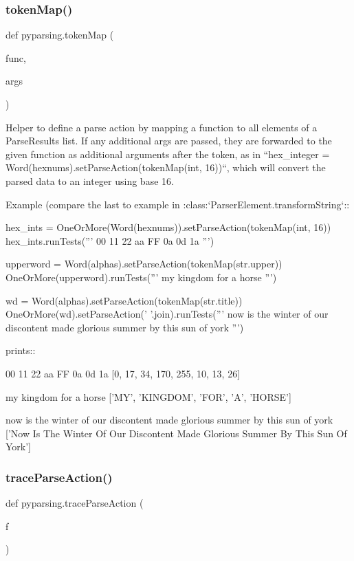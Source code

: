 \subsubsection{\texorpdfstring{token\+Map()}{tokenMap()}}
{\footnotesize\ttfamily def pyparsing.\+token\+Map (\begin{DoxyParamCaption}\item[{}]{func,  }\item[{}]{args }\end{DoxyParamCaption})}

\begin{DoxyVerb}Helper to define a parse action by mapping a function to all
elements of a ParseResults list. If any additional args are passed,
they are forwarded to the given function as additional arguments
after the token, as in
``hex_integer = Word(hexnums).setParseAction(tokenMap(int, 16))``,
which will convert the parsed data to an integer using base 16.

Example (compare the last to example in :class:`ParserElement.transformString`::

    hex_ints = OneOrMore(Word(hexnums)).setParseAction(tokenMap(int, 16))
    hex_ints.runTests('''
        00 11 22 aa FF 0a 0d 1a
        ''')

    upperword = Word(alphas).setParseAction(tokenMap(str.upper))
    OneOrMore(upperword).runTests('''
        my kingdom for a horse
        ''')

    wd = Word(alphas).setParseAction(tokenMap(str.title))
    OneOrMore(wd).setParseAction(' '.join).runTests('''
        now is the winter of our discontent made glorious summer by this sun of york
        ''')

prints::

    00 11 22 aa FF 0a 0d 1a
    [0, 17, 34, 170, 255, 10, 13, 26]

    my kingdom for a horse
    ['MY', 'KINGDOM', 'FOR', 'A', 'HORSE']

    now is the winter of our discontent made glorious summer by this sun of york
    ['Now Is The Winter Of Our Discontent Made Glorious Summer By This Sun Of York']
\end{DoxyVerb}
 \mbox{\label{namespacepyparsing_a90995c5cae27231b18d57f49d55db206}} 
\subsubsection{\texorpdfstring{trace\+Parse\+Action()}{traceParseAction()}}
{\footnotesize\ttfamily def pyparsing.\+trace\+Parse\+Action (\begin{DoxyParamCaption}\item[{}]{f }\end{DoxyParamCaption})}

